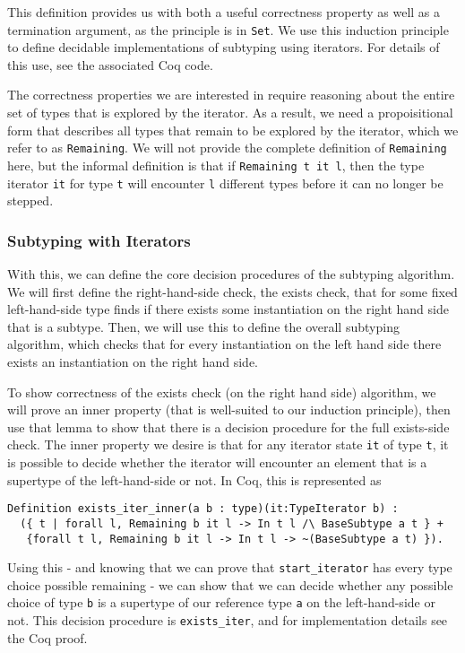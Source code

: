 \documentclass[a4paper,UKenglish]{lipics-v2018}
\begin{document}
This definition provides us with both a useful correctness property as well as
a termination argument, as the principle is in \verb|Set|. We use this
induction principle to define decidable implementations of subtyping using
iterators. For details  of this use, see the associated Coq code.

The correctness properties we are interested in require reasoning about the
entire set of types that is explored by the iterator. As a result, we need a
propoisitional form that describes all types that remain to be explored by the
iterator, which we refer to as  \verb|Remaining|. We will not provide the
complete definition of \verb|Remaining| here,  but the informal definition is
that if \verb|Remaining t it l|, then the type iterator \verb|it| for type
\verb|t| will encounter \verb|l| different types before it can no longer be
stepped.  

\subsubsection{Subtyping with Iterators}

With this, we can define the core decision procedures of the subtyping
algorithm. We will first define the right-hand-side check, the exists check,
that for some fixed left-hand-side type finds if there exists some instantiation
on the right hand side that is a subtype. Then, we will use this to define the overall
subtyping algorithm, which checks that for every instantiation on the left hand side
there exists an instantiation on the right hand side.

To show correctness of the exists check (on the right hand side) algorithm, we will
prove an inner property (that is well-suited to our induction principle), then use that
lemma to show that there is a decision procedure for the full exists-side check. The 
inner property we desire is that for any iterator state \verb|it| of type \verb|t|, it
is possible to decide whether the iterator will encounter an element that is a supertype
of the left-hand-side or not. In Coq, this is represented as

\begin{verbatim}
Definition exists_iter_inner(a b : type)(it:TypeIterator b) :
  ({ t | forall l, Remaining b it l -> In t l /\ BaseSubtype a t } +
   {forall t l, Remaining b it l -> In t l -> ~(BaseSubtype a t) }).
\end{verbatim}

Using this - and knowing that we can prove that \verb|start_iterator| has
every type choice possible remaining - we can show that we can decide whether
any possible choice of type \verb|b| is a supertype of our reference type
\verb|a| on the left-hand-side or not. This decision procedure is \verb|exists_iter|,
and for implementation details see the Coq proof.
\end{document}
